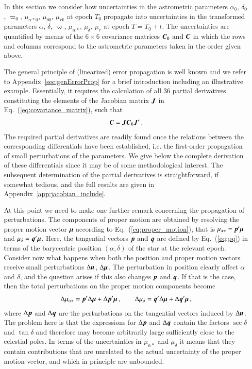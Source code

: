 \documentclass{aa}
\def\vec#1{\ensuremath{\mathchoice{\mbox{\boldmath$\displaystyle#1$}}
{\mbox{\boldmath$\textstyle#1$}}
{\mbox{\boldmath$\scriptstyle#1$}}
{\mbox{\boldmath$\scriptscriptstyle#1$}}}}
\begin{document}
In this section we consider how uncertainties in the astrometric parameters
$\alpha_0$, $\delta_0$, $\varpi_0$, $\mu_{\alpha*0}$, $\mu_{\delta 0}$, $\mu_{r0}$ at epoch $T_0$
propagate into uncertainties in the transformed parameters
$\alpha$, $\delta$, $\varpi$, $\mu_{\alpha*}$, $\mu_\delta$, $\mu_r$ at epoch $T=T_0+t$.
The uncertainties are quantified by means of the $6\times 6$ covariance matrices $\vec{C}_0$
and $\vec{C}$ in which the rows and columns correspond to the astrometric
parameters taken in the order given above.

The general principle of (linearized) error propagation is well known and we refer to
Appendix~\ref{sec:genErrorProp} for a brief introduction including an illustrative example.
Essentially, it requires the calculation of all 36 partial derivatives constituting the
elements of the Jacobian matrix $\vec{J}$ in Eq.~(\ref{eq:covariance_matrix}), such that
\begin{equation}\label{eq:covariance_matrix1}
    \vec{C}=\vec{J}\vec{C}_0\vec{J}'\,.
\end{equation}
The required partial derivatives are readily found once the relations between the corresponding
differentials have been established, i.e. the first-order propagation of small perturbations of the
parameters. We give below the complete derivation of these differentials since it may be of some
methodological interest. The subsequent determination of the partial derivatives is straightforward,
if somewhat tedious, and the full results are given in Appendix~\ref{app:jacobian_include}.

At this point we need to make one further remark concerning the propagation of perturbations.
The components of proper motion are obtained by resolving the proper motion vector
$\vec{\mu}$ according to Eq.~(\ref{eq:proper_motion}), that is $\mu_{\alpha*}=\vec{p}'\vec{\mu}$
and $\mu_\delta=\vec{q}'\vec{\mu}$. Here, the tangential vectors $\vec{p}$ and $\vec{q}$ are
defined by Eq.~(\ref{eq:pq}) in terms of the barycentric position $(\alpha,\delta)$ of the star at
the relevant epoch. Consider now what happens when both the position and proper motion vectors
receive small perturbations $\Delta\vec{u}$, $\Delta\vec{\mu}$. The perturbation in position
clearly affect $\alpha$ and $\delta$, and the question arises if this also changes $\vec{p}$ and
$\vec{q}$. If that is the case, then the total perturbations on the proper motion components
become
\begin{equation}\label{eq:perturbedMuPQ}
    \Delta\mu_{\alpha*} = \vec{p}'\Delta\vec{\mu} + \Delta\vec{p}'\vec{\mu} \, ,
\quad\quad
    \Delta\mu_\delta = \vec{q}'\Delta\vec{\mu} + \Delta\vec{q}'\vec{\mu} \, ,
\end{equation}
where $\Delta\vec{p}$ and $\Delta\vec{q}$ are the perturbations on the tangential vectors
induced by $\Delta\vec{u}$. The problem here is that the expressions for $\Delta\vec{p}$
and $\Delta\vec{q}$ contain the factors $\sec\delta$ and $\tan\delta$ and therefore may
become arbitrarily large sufficiently close to the celestial poles. In terms of the uncertainties
in $\mu_{\alpha*}$ and $\mu_\delta$ it means that they contain contributions that are
unrelated to the actual uncertainty of the proper motion vector, and which in principle are
unbounded.
\end{document}
